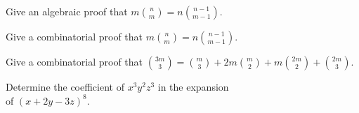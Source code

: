 \begin{prob}
Give an algebraic proof that $\displaystyle m\binom{n}{m} = n\binom{n-1}{m-1}$.
\end{prob}

\begin{prob}
Give a combinatorial proof that $\displaystyle m\binom{n}{m} = n\binom{n-1}{m-1}$.
\end{prob}


\begin{prob}
Give a combinatorial proof that $\displaystyle{{3m\choose 3}={m\choose 3}+2m{m\choose 2}+m{2m\choose 2} +{2m\choose 3}}$.
\end{prob}


\begin{prob}
Determine the coefficient of $x^3y^2z^3$ in the expansion\\ of $(x+2y-3z)^8$.
\end{prob}
